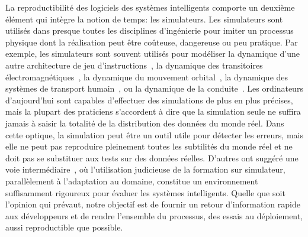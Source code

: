 La reproductibilité des logiciels des systèmes intelligents comporte un deuxième élément qui intègre la notion de temps: les simulateurs. Les simulateurs sont utilisés dans presque toutes les disciplines d'ingénierie pour imiter un processus physique dont la réalisation peut être coûteuse, dangereuse ou peu pratique. Par exemple, les simulateurs sont souvent utilisés pour modéliser la dynamique d'une autre architecture de jeu d'instructions~\citep{bellard2005qemu}, la dynamique des transitoires électromagnétiques~\citep{tavante2018opensi}, la dynamique du mouvement orbital~\citep{bellman1965wengert}, la dynamique des systèmes de transport humain~\citep{ruch2018amodeus}, ou la dynamique de la conduite~\citep{gym_duckietown}. Les ordinateurs d'aujourd'hui sont capables d'effectuer des simulations de plus en plus précises, mais la plupart des praticiens s'accordent à dire que la simulation seule ne suffira jamais à saisir la totalité de la distribution des données du monde réel. Dans cette optique, la simulation peut être un outil utile pour détecter les erreurs, mais elle ne peut pas reproduire pleinement toutes les subtilités du monde réel et ne doit pas se substituer aux tests sur des données réelles. D'autres ont suggéré une voie intermédiaire~\citep{bousmalis2018using}, où l'utilisation judicieuse de la formation sur simulateur, parallèlement à l'adaptation au domaine, constitue un environnement suffisamment rigoureux pour évaluer les systèmes intelligents. Quelle que soit l'opinion qui prévaut, notre objectif est de fournir un retour d'information rapide aux développeurs et de rendre l'ensemble du processus, des essais au déploiement, aussi reproductible que possible.

%

